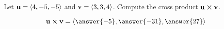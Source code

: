 \documentclass{ximera}
\author{Gregory Hartman \and Matthew Carr}
\begin{document}
\begin{exercise}



Let $\mathbf{u}=\left\langle 4,-5,-5\right\rangle$ and $\mathbf{v}=\left\langle 3,3,4\right\rangle$. Compute the cross product $\mathbf{u} \boldsymbol\times \mathbf{v}$.

\begin{prompt}
\[
\vec{u}\cross\vec{v}=\vector{\answer{-5},\answer{-31},\answer{27}}
\]
\end{prompt}


\end{exercise}
\end{document}
